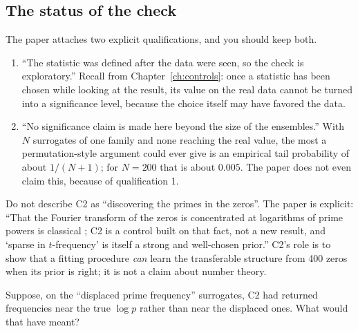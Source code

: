 \subsection{The status of the check}

The paper attaches two explicit qualifications, and you should keep both.
\begin{enumerate}
\item ``The statistic was defined after the data were seen, so the check is exploratory.'' Recall from Chapter~\ref{ch:controls}: once a statistic has been chosen while looking at the result, its value on the real data cannot be turned into a significance level, because the choice itself may have favored the data.
\item ``No significance claim is made here beyond the size of the ensembles.'' With $N$ surrogates of one family and none reaching the real value, the most a permutation-style argument could ever give is an empirical tail probability of about $1/(N+1)$; for $N=200$ that is about $0.005$. The paper does not even claim this, because of qualification 1.
\end{enumerate}

\begin{pitfall}
Do not describe C2 as ``discovering the primes in the zeros''. The paper is explicit: ``That the Fourier transform of the zeros is concentrated at logarithms of prime powers is classical \cite{landau,gonek}; C2 is a control built on that fact, not a new result, and `sparse in $t$-frequency' is itself a strong and well-chosen prior.'' C2's role is to show that a fitting procedure \emph{can} learn the transferable structure from 400 zeros when its prior is right; it is not a claim about number theory.
\end{pitfall}

\begin{checkpoint}
Suppose, on the ``displaced prime frequency'' surrogates, C2 had returned frequencies near the true $\log p$ rather than near the displaced ones. What would that have meant?
\end{checkpoint}

